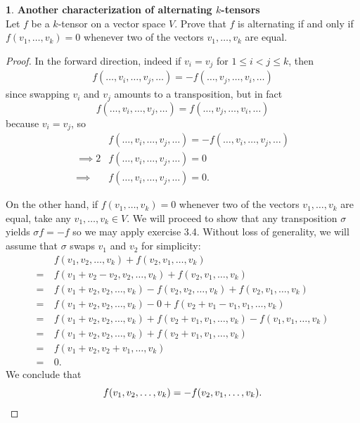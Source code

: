 \documentclass[12pt]{article}
\theoremstyle{definition}
\newtheorem{ex}{}[section]
\begin{document}
\begin{ex}
	\textbf{Another characterization of alternating $k$-tensors} \\
	Let $f$ be a $k$-tensor on a vector space $V$.
	Prove that $f$ is alternating if and only if $f(v_1, \dots, v_k) = 0$ whenever two of the vectors $v_1, \dots, v_k$ are equal.
\end{ex}
\begin{proof}
	In the forward direction, indeed if $v_i = v_j$ for $1 \leq i < j \leq k$, then \begin{align*}
		f(\dots, v_i, \dots, v_j, \dots) = -f(\dots, v_j, \dots, v_i, \dots)
	\end{align*}
	since swapping $v_i$ and $v_j$ amounts to a transposition, but in fact \begin{equation*}
		f(\dots, v_i, \dots, v_j, \dots) = f(\dots, v_j, \dots, v_i, \dots)
	\end{equation*}
	because $v_i = v_j$, so \begin{align*}
		           & f(\dots, v_i, \dots, v_j, \dots) = -f(\dots, v_i, \dots, v_j, \dots) \\
		\implies 2 & f(\dots, v_i, \dots, v_j, \dots) = 0                                 \\
		\implies   & f(\dots, v_i, \dots, v_j, \dots) = 0.
	\end{align*}

	On the other hand, if $f(v_1, \dots, v_k) = 0$ whenever two of the vectors $v_1, \dots, v_k$ are equal, take any $v_1, \dots, v_k \in V$.
	We will proceed to show that any transposition $\sigma$ yields $\sigma f = -f$ so we may apply exercise 3.4.
	Without loss of generality, we will assume that $\sigma$ swaps $v_1$ and $v_2$ for simplicity:
	\begin{align*}
		    & f(v_1, v_2, \dots, v_k) + f(v_2, v_1, \dots, v_k)                                       \\
		=\  & f(v_1 + v_2 - v_2, v_2, \dots, v_k) + f(v_2, v_1, \dots, v_k)                           \\
		=\  & f(v_1 + v_2, v_2, \dots, v_k) - f(v_2, v_2, \dots, v_k) + f(v_2, v_1, \dots, v_k)       \\
		=\  & f(v_1 + v_2, v_2, \dots, v_k) - 0 + f(v_2 + v_1 - v_1, v_1, \dots, v_k)                 \\
		=\  & f(v_1 + v_2, v_2, \dots, v_k) + f(v_2 + v_1, v_1, \dots, v_k) - f(v_1, v_1, \dots, v_k) \\
		=\  & f(v_1 + v_2, v_2, \dots, v_k) + f(v_2 + v_1, v_1, \dots, v_k)                           \\
		=\  & f(v_1 + v_2, v_2 + v_1, \dots, v_k)                                                     \\
		=\  & 0.
	\end{align*}
	We conclude that \begin{equation*}
		f(v_1, v_2, \dots, v_k) = -f(v_2, v_1, \dots, v_k).                  \\
	\end{equation*}
\end{proof}
\end{document}
